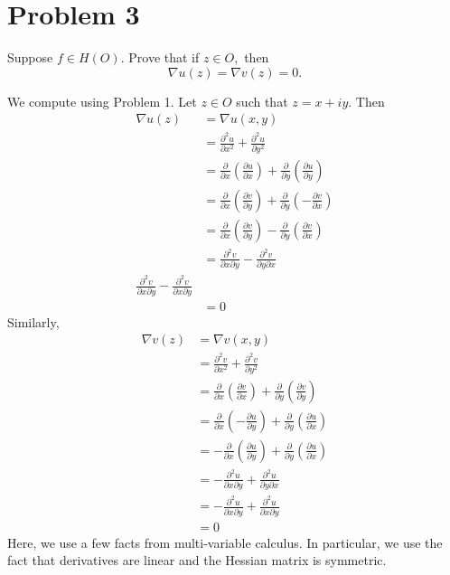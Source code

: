 \documentclass[11pt]{article}
\begin{document}
\newpage
\section*{Problem 3}
\begin{problem}
    Suppose $f \in H(O).$ Prove that if $z\in O,$ then
    \[\nabla  u(z) = \nabla v(z) = 0.\]
\end{problem}
\begin{solution}
    We compute using Problem 1. Let $z\in O$ such that $z = x + iy.$ Then
    \begin{align*}
        \nabla  u(z)  &= \nabla u(x,y)\\
        &= \frac{\partial^2 u}{\partial x^2} + \frac{\partial ^2 u}{\partial y^2}\\
        &= \frac{\partial}{\partial x}(\frac{\partial u}{\partial x}) + \frac{\partial}{\partial y}(\frac{\partial u}{\partial y})\\
        &= \frac{\partial}{\partial x}(\frac{\partial v}{\partial y}) + \frac{\partial}{\partial y}(-\frac{\partial v}{\partial x})\\
        &= \frac{\partial}{\partial x}(\frac{\partial v}{\partial y}) - \frac{\partial}{\partial y}(\frac{\partial v}{\partial x})\\
        &= \frac{\partial^2 v}{\partial x \partial y} - \frac{\partial^2 v}{\partial y\partial x}\\
        \frac{\partial^2 v}{\partial x \partial y} - \frac{\partial^2 v}{\partial x\partial y}\\
        &= 0
    \end{align*}
    Similarly,
    \begin{align*}
        \nabla  v(z)  &= \nabla v(x,y)\\
        &= \frac{\partial^2 v}{\partial x^2} + \frac{\partial ^2 v}{\partial y^2}\\
        &= \frac{\partial}{\partial x}(\frac{\partial v}{\partial x}) + \frac{\partial}{\partial y}(\frac{\partial v}{\partial y})\\
        &= \frac{\partial}{\partial x}(-\frac{\partial u}{\partial y}) + \frac{\partial}{\partial y}(\frac{\partial u}{\partial x})\\
        &= -\frac{\partial}{\partial x}(\frac{\partial u}{\partial y}) + \frac{\partial}{\partial y}(\frac{\partial u}{\partial x})\\
        &=-\frac{\partial^2 u}{\partial x\partial y} + \frac{\partial^2 u}{\partial y\partial x}\\
        &= -\frac{\partial^2 u}{\partial x\partial y} + \frac{\partial^2 u}{\partial x\partial y}\\
        &= 0
    \end{align*}
Here, we use a few facts from multi-variable calculus. In particular, we use the fact that derivatives are linear and the Hessian matrix is symmetric.
\end{solution}
\end{document}
